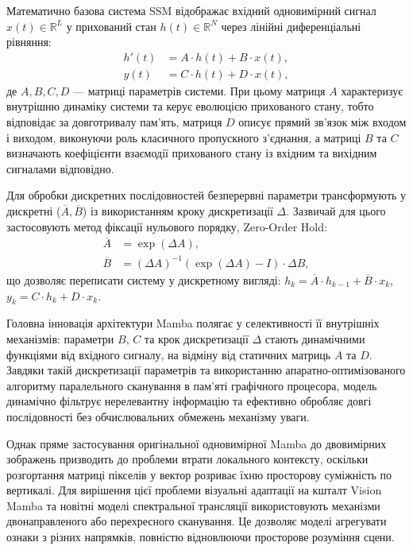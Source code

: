             Математично базова система SSM відображає вхідний одновимірний сигнал $x(t) \in \mathbb{R}^L$ у прихований стан $h(t) \in \mathbb{R}^N$ через лінійні диференціальні рівняння:
            \begin{align*}
                h'(t) &= A \cdot h(t) + B \cdot x(t), \\
                y(t) &= C \cdot h(t) + D \cdot x(t),
            \end{align*}
            де $A, B, C, D$ --- матриці параметрів системи.
            При цьому матриця $A$ характеризує внутрішню динаміку системи та керує еволюцією прихованого стану, тобто відповідає за довготривалу пам'ять,
            матриця $D$ описує прямий зв'язок між входом і виходом, виконуючи роль класичного пропускного з'єднання,
            а матриці $B$ та $C$ визначають коефіцієнти взаємодії прихованого стану із вхідним та вихідним сигналами відповідно.

            Для обробки дискретних послідовностей безперервні параметри трансформують у дискретні ($\overline{A}, \overline{B}$) із використанням кроку дискретизації $\Delta$. Зазвичай для цього застосовують метод фіксації нульового порядку, Zero-Order Hold:
            \begin{align*}
                \overline{A} &= \exp(\Delta A), \\
                \overline{B} &= (\Delta A)^{-1}(\exp(\Delta A) - I) \cdot \Delta B,
            \end{align*}
            що дозволяє переписати систему у дискретному вигляді: $h_k = \overline{A} \cdot h_{k-1} + \overline{B} \cdot x_k$, $y_k = C \cdot h_k + D \cdot x_k$.

            Головна інновація архітектури Mamba полягає у селективності її внутрішніх механізмів:
            параметри $B$, $C$ та крок дискретизації $\Delta$ стають динамічними функціями від вхідного сигналу,
            на відміну від статичних матриць $A$ та $D$.
            Завдяки такій дискретизації параметрів та використанню апаратно-оптимізованого алгоритму паралельного сканування в пам'яті графічного процесора,
            модель динамічно фільтрує нерелевантну інформацію та ефективно обробляє довгі послідовності без обчислювальних обмежень механізму уваги.

            Однак пряме застосування оригінальної одновимірної Mamba до двовимірних зображень призводить до проблеми втрати локального контексту,
            оскільки розгортання матриці пікселів у вектор розриває їхню просторову суміжність по вертикалі.
            Для вирішення цієї проблеми візуальні адаптації на кшталт Vision Mamba \cite{2024-vim} та новітні моделі спектральної трансляції \cite{2024-colormamba} використовують механізми двонаправленого або перехресного сканування.
            Це дозволяє моделі агрегувати ознаки з різних напрямків, повністю відновлюючи просторове розуміння сцени.

